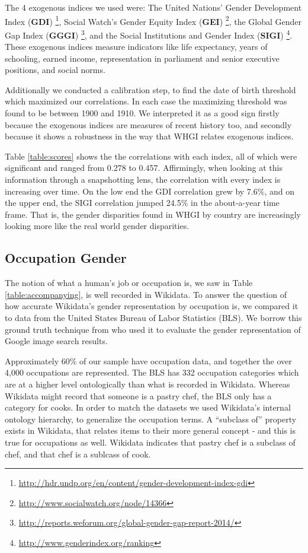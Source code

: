 \documentclass[letterpaper]{article}
\begin{document}
The 4 exogenous indices we used were: The United Nations' Gender Development Index (\textbf{GDI})  \footnote{\url{http://hdr.undp.org/en/content/gender-development-index-gdi}},  Social Watch's Gender Equity Index (\textbf{GEI}) \footnote{\url{http://www.socialwatch.org/node/14366}},  the Global Gender Gap Index (\textbf{GGGI}) \footnote{\url{http://reports.weforum.org/global-gender-gap-report-2014/}}, and the Social Institutions and Gender Index (\textbf{SIGI}) \footnote{\url{http://www.genderindex.org/ranking}}. 
These exogenous indices measure indicators like life expectancy, years of schooling, earned income, representation in parliament and senior executive positions, and social norms.

Additionally we conducted a calibration step, to find the date of birth threshold which maximized our correlations. In each case the maximizing threshold was found to be between 1900 and 1910. We interpreted it as a good sign firstly because the exogenous indices are measures of recent history too, and secondly because it shows a robustness in the way that WHGI relates exogenous indices.

Table \ref{table:scores} shows the the correlations with each index, all of which were significant and ranged from 0.278 to 0.457. Affirmingly, when looking at this information through a snapshotting lens, the correlation with every index is increasing over time. On the low end the GDI correlation grew by 7.6\%, and on the upper end, the SIGI correlation jumped 24.5\% in the about-a-year time frame. That is, the gender disparities found in WHGI by country are increasingly looking more like the real world gender disparities.


\subsection{Occupation Gender}
The notion of what a human's job or occupation is, we saw in Table \ref{table:accompanying}, is well recorded in Wikidata. To answer the question of how accurate Wikidata's gender representation by occupation is, we compared it to data from the United States Bureau of Labor Statistics (BLS). We borrow this ground truth technique from \cite{kay_unequal_2015} who used it to evaluate the gender representation of Google image search results.

Approximately 60\% of our sample have occupation data, and together the over 4,000 occupations are represented. The BLS has 332 occupation categories which are at a higher level ontologically than what is recorded in Wikidata. Whereas Wikidata might record that someone is a pastry chef, the BLS only has a category for cooks. In order to match the datasets we used Wikidata's internal ontology hierarchy, to generalize the occupation terms. A ``subclass of'' property exists in Wikidata, that relates items to their more general concept - and this is true for occupations as well. Wikidata indicates that pastry chef is a subclass of chef, and that chef is a sublcass of cook. 
\end{document}
